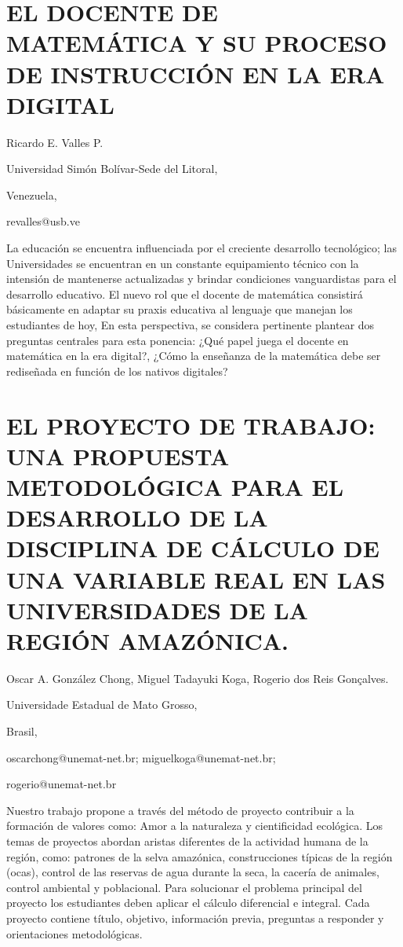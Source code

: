 \setcounter{section}{100}


\section{EL DOCENTE DE MATEMÁTICA Y SU PROCESO DE INSTRUCCIÓN EN LA ERA DIGITAL }

\begin{datos}

Ricardo E. Valles P. 

Universidad Simón Bolívar-Sede del Litoral,

Venezuela,

revalles@usb.ve 

\end{datos}

La educación se encuentra influenciada por el creciente desarrollo
tecnológico; las Universidades se encuentran en un constante equipamiento
técnico con la intensión de mantenerse actualizadas y brindar condiciones
vanguardistas para el desarrollo educativo. El nuevo rol que el docente
de matemática consistirá básicamente en adaptar su praxis educativa
al lenguaje que manejan los estudiantes de hoy, En esta perspectiva,
se considera pertinente plantear dos preguntas centrales para esta
ponencia: ¿Qué papel juega el docente en matemática en la era digital?,
¿Cómo la enseñanza de la matemática debe ser rediseñada en función
de los nativos digitales? 


\section{EL PROYECTO DE TRABAJO: UNA PROPUESTA METODOLÓGICA PARA EL DESARROLLO
DE LA DISCIPLINA DE CÁLCULO DE UNA VARIABLE REAL EN LAS UNIVERSIDADES
DE LA REGIÓN AMAZÓNICA. }

\begin{datos}

Oscar A. González Chong, Miguel Tadayuki Koga, Rogerio dos Reis Gonçalves.

Universidade Estadual de Mato Grosso,

Brasil,

oscarchong@unemat-net.br; miguelkoga@unemat-net.br;

rogerio@unemat-net.br

\end{datos}

Nuestro trabajo propone a través del método de proyecto contribuir
a la formación de valores como: Amor a la naturaleza y cientificidad
ecológica. Los temas de proyectos abordan aristas diferentes de la
actividad humana de la región, como: patrones de la selva amazónica,
construcciones típicas de la región (ocas), control de las reservas
de agua durante la seca, la cacería de animales, control ambiental
y poblacional. Para solucionar el problema principal del proyecto
los estudiantes deben aplicar el cálculo diferencial e integral. Cada
proyecto contiene título, objetivo, información previa, preguntas
a responder y orientaciones metodológicas.


